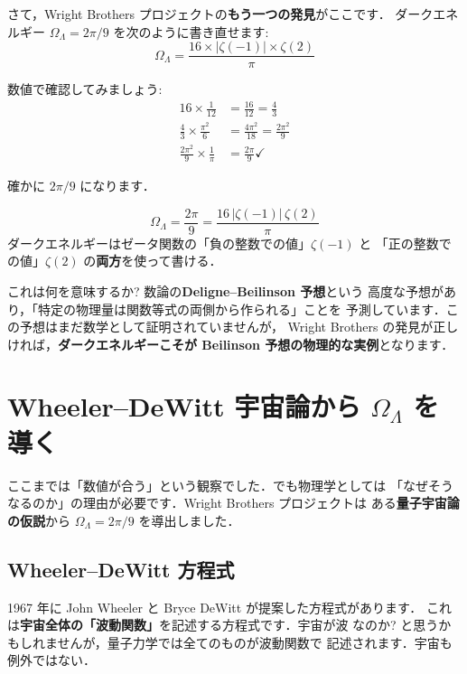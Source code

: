 \documentclass[11pt,a4paper]{article}
\begin{document}
さて，Wright Brothers プロジェクトの\textbf{もう一つの発見}がここです．
ダークエネルギー $\Omega_\Lambda = 2\pi/9$ を次のように書き直せます:
\begin{equation*}
\Omega_\Lambda = \frac{16 \times |\zeta(-1)| \times \zeta(2)}{\pi}
\end{equation*}

数値で確認してみましょう:
\begin{align*}
16 \times \frac{1}{12} &= \frac{16}{12} = \frac{4}{3}\\
\frac{4}{3} \times \frac{\pi^2}{6} &= \frac{4\pi^2}{18} = \frac{2\pi^2}{9}\\
\frac{2\pi^2}{9} \times \frac{1}{\pi} &= \frac{2\pi}{9} ✓
\end{align*}

確かに $2\pi/9$ になります．

\begin{tcolorbox}[colback=green!5,colframe=green!60!black,title=発見 2]
\begin{equation*}
\Omega_\Lambda = \frac{2\pi}{9} = \frac{16\,|\zeta(-1)|\,\zeta(2)}{\pi}
\end{equation*}
ダークエネルギーはゼータ関数の「負の整数での値」$\zeta(-1)$ と
「正の整数での値」$\zeta(2)$ の\textbf{両方}を使って書ける．
\end{tcolorbox}

これは何を意味するか? 数論の\textbf{Deligne--Beilinson 予想}という
高度な予想があり，「特定の物理量は関数等式の両側から作られる」ことを
予測しています．この予想はまだ数学として証明されていませんが，
Wright Brothers の発見が正しければ，\textbf{ダークエネルギーこそが
Beilinson 予想の物理的な実例}となります．

\section{Wheeler--DeWitt 宇宙論から $\Omega_\Lambda$ を導く}

ここまでは「数値が合う」という観察でした．でも物理学としては
「なぜそうなるのか」の理由が必要です．Wright Brothers プロジェクトは
ある\textbf{量子宇宙論の仮説}から $\Omega_\Lambda = 2\pi/9$ を導出しました．

\subsection{Wheeler--DeWitt 方程式}

1967 年に John Wheeler と Bryce DeWitt が提案した方程式があります．
これは\textbf{宇宙全体の「波動関数」}を記述する方程式です．宇宙が波
なのか? と思うかもしれませんが，量子力学では全てのものが波動関数で
記述されます．宇宙も例外ではない．
\end{document}
